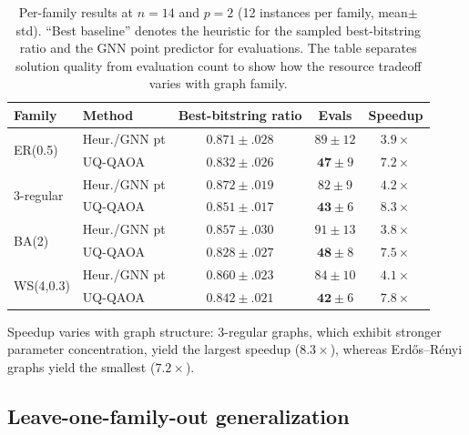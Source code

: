 \documentclass[aps,prx,reprint,superscriptaddress,longbibliography]{revtex4-2}
\newcommand{\GNN}{\textnormal{\textsc{GNN}}}
\newcommand{\UQQAOA}{\textnormal{\textsc{UQ-QAOA}}}
\begin{document}
\begin{table}[t]
\caption{Per-family results at $n{=}14$ and $p{=}2$ (12 instances per
family, mean$\pm$std). ``Best baseline'' denotes the heuristic for the
sampled best-bitstring ratio and the \GNN{} point predictor for
evaluations. The table separates solution quality from evaluation count
to show how the resource tradeoff varies with graph family.
\label{tab:perfamily}}
\begin{ruledtabular}
\scriptsize
\begin{tabular*}{\columnwidth}{@{\extracolsep{\fill}}llccc}
    Family & Method & Best-bitstring ratio & Evals
    & Speedup \\
    \hline
    \multirow{2}{*}{ER(0.5)}
    & Heur./\GNN{} pt
      & $\mathbf{0.871}\pm .028$ & $89\pm 12$
      & $3.9\times$ \\
      & \UQQAOA{}
      & $0.832\pm .026$ & $\mathbf{47}\pm 9$
      & $\mathbf{7.2\times}$ \\[2pt]
    \multirow{2}{*}{3-regular}
    & Heur./\GNN{} pt
      & $\mathbf{0.872}\pm .019$ & $82\pm 9$
      & $4.2\times$ \\
      & \UQQAOA{}
      & $0.851\pm .017$ & $\mathbf{43}\pm 6$
      & $\mathbf{8.3\times}$ \\[2pt]
    \multirow{2}{*}{BA(2)}
    & Heur./\GNN{} pt
      & $\mathbf{0.857}\pm .030$ & $91\pm 13$
      & $3.8\times$ \\
      & \UQQAOA{}
      & $0.828\pm .027$ & $\mathbf{48}\pm 8$
      & $\mathbf{7.5\times}$ \\[2pt]
    \multirow{2}{*}{WS(4,0.3)}
    & Heur./\GNN{} pt
      & $\mathbf{0.860}\pm .023$ & $84\pm 10$
      & $4.1\times$ \\
      & \UQQAOA{}
      & $0.842\pm .021$ & $\mathbf{42}\pm 6$
      & $\mathbf{7.8\times}$ \\
\end{tabular*}
\end{ruledtabular}
\end{table}

Speedup varies with graph structure: 3-regular graphs, which exhibit
stronger parameter concentration, yield the largest speedup
($8.3\times$), whereas Erd\H{o}s--R\'enyi graphs yield the smallest
($7.2\times$).

\subsection{Leave-one-family-out generalization}
\label{sec:lofo}
\end{document}
